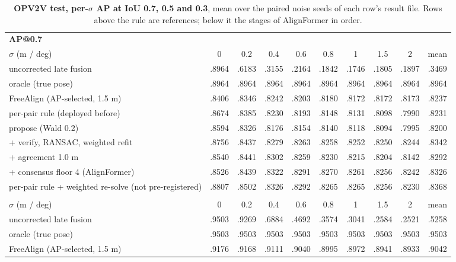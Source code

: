 \begin{table}[t]
  \centering\small
  \caption{\textbf{OPV2V test, per-$\sigma$ AP at IoU 0.7, 0.5 and 0.3}, mean over the paired noise seeds of each row's result file. Rows above the rule are references; below it the stages of AlignFormer in order.}
  \label{tab:supp_sigma_opv2v}
  \begin{tabular}{lccccccccc}
    \toprule
    \multicolumn{10}{l}{\textbf{AP@0.7}} \\
    $\sigma$ (m / deg) & 0 & 0.2 & 0.4 & 0.6 & 0.8 & 1 & 1.5 & 2 & mean \\
    \midrule
    uncorrected late fusion & .8964 & .6183 & .3155 & .2164 & .1842 & .1746 & .1805 & .1897 & .3469 \\
    oracle (true pose) & .8964 & .8964 & .8964 & .8964 & .8964 & .8964 & .8964 & .8964 & .8964 \\
    FreeAlign (AP-selected, 1.5 m) & .8406 & .8346 & .8242 & .8203 & .8180 & .8172 & .8172 & .8173 & .8237 \\
    \midrule
    per-pair rule (deployed before) & .8674 & .8385 & .8230 & .8193 & .8148 & .8131 & .8098 & .7990 & .8231 \\
    propose (Wald 0.2) & .8594 & .8326 & .8176 & .8154 & .8140 & .8118 & .8094 & .7995 & .8200 \\
    + verify, RANSAC, weighted refit & .8756 & .8437 & .8279 & .8263 & .8258 & .8252 & .8250 & .8244 & .8342 \\
    + agreement 1.0 m & .8540 & .8441 & .8302 & .8259 & .8230 & .8215 & .8204 & .8142 & .8292 \\
    + consensus floor 4 (AlignFormer) & .8526 & .8439 & .8322 & .8291 & .8270 & .8261 & .8256 & .8242 & .8326 \\
    per-pair rule + weighted re-solve (not pre-registered) & .8807 & .8502 & .8326 & .8292 & .8265 & .8265 & .8256 & .8230 & .8368 \\
    \addlinespace
    \multicolumn{10}{l}{\textbf{AP@0.5}} \\
    $\sigma$ (m / deg) & 0 & 0.2 & 0.4 & 0.6 & 0.8 & 1 & 1.5 & 2 & mean \\
    \midrule
    uncorrected late fusion & .9503 & .9269 & .6884 & .4692 & .3574 & .3041 & .2584 & .2521 & .5258 \\
    oracle (true pose) & .9503 & .9503 & .9503 & .9503 & .9503 & .9503 & .9503 & .9503 & .9503 \\
    FreeAlign (AP-selected, 1.5 m) & .9176 & .9168 & .9111 & .9040 & .8995 & .8972 & .8941 & .8933 & .9042 \\

\end{tabular}
\end{table}
